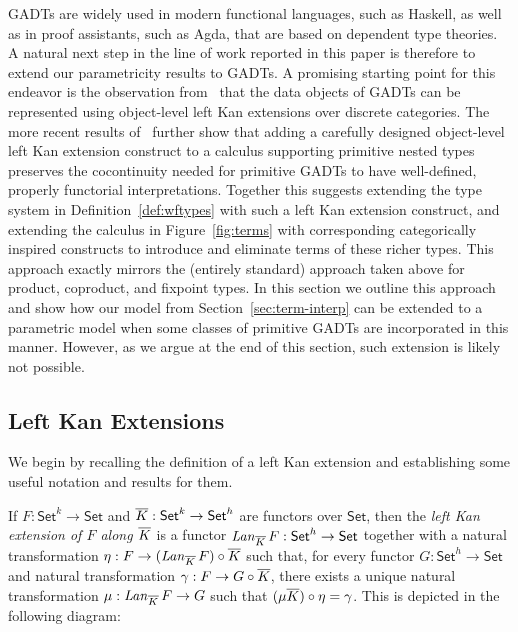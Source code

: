 \documentclass{lmcs}
\theoremstyle{plain}\newtheorem{satz}[thm]{Satz}
\newcommand{\set}{\mathsf{Set}}
\begin{document}
{GADTs are widely used in modern functional languages, such as Haskell,
as well as in proof assistants, such as Agda, that are based on
dependent type theories. A natural next step in the line of work
reported in this paper is therefore to extend our parametricity
results to GADTs. A promising starting point for this endeavor is the
observation from~\cite{jg08} that the data objects of GADTs can be
represented using object-level left Kan extensions over discrete
categories. The more recent results of~\cite{jp19} further show that
adding a carefully designed object-level left Kan extension construct
to a calculus supporting primitive nested types preserves the
cocontinuity needed for primitive GADTs to have well-defined, properly
functorial interpretations. Together this suggests extending the type
system in Definition~\ref{def:wftypes} with such a left Kan extension
construct, and extending the calculus in Figure~\ref{fig:terms} with
corresponding categorically inspired constructs to introduce and
eliminate terms of these richer types. This approach exactly mirrors
the (entirely standard) approach taken above for product, coproduct,
and fixpoint types. In this section we outline this approach and show
how our model from Section~\ref{sec:term-interp} can be extended to a
parametric model when some classes of primitive GADTs are incorporated
in this manner. However, as we argue at the end of this section, such
extension is likely not possible.

\subsection{Left Kan Extensions}\label{sec:lke}

We begin by recalling the definition of a left Kan extension and
establishing some useful notation and results for them.

\begin{defi}\label{def:lke}
If $F : \set^k \to \set$ and $\ol{K} : \set^k \to \set^h$ are functors
over $\set$, then the {\em left Kan extension of $F$ along $\overline{K}$} is
a functor $\mathit{Lan}_{\ol K}\,F : \set^h \to \set$ together with a
natural transformation $\eta : F \to (\mathit{Lan}_{\overline{K}}\,F)
\circ \overline{K}$
such that, for every functor $G : \set^h \to \set$ and natural
transformation $\gamma : F \to G \circ \overline{K}$, there exists a unique
natural transformation $\mu : \mathit{Lan}_{\overline{K}}\,F \to G$ such that
$(\mu {\overline{K}}) \circ \eta = \gamma$. This is depicted in the
following diagram:

\vspace*{-0.05in}


\end{defi}}
\end{document}
